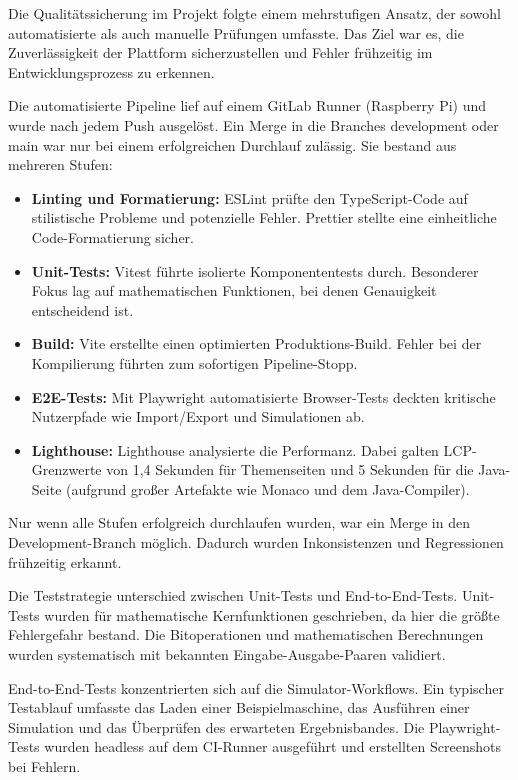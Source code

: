  \label{5_1_QS}

Die Qualitätssicherung im Projekt folgte einem mehrstufigen Ansatz, der sowohl automatisierte als auch manuelle Prüfungen umfasste. Das Ziel war es, die Zuverlässigkeit der Plattform sicherzustellen und Fehler frühzeitig im Entwicklungsprozess zu erkennen.


Die automatisierte Pipeline lief auf einem GitLab Runner (Raspberry Pi) und wurde nach jedem Push ausgelöst. Ein Merge in die Branches development oder main war nur bei einem erfolgreichen Durchlauf zulässig. Sie bestand aus mehreren Stufen:
\begin{itemize}
  \item \textbf{Linting und Formatierung:} ESLint prüfte den TypeScript-Code auf stilistische Probleme und potenzielle Fehler. Prettier stellte eine einheitliche Code-Formatierung sicher.
  \item \textbf{Unit-Tests:} Vitest führte isolierte Komponententests durch. Besonderer Fokus lag auf mathematischen Funktionen, bei denen Genauigkeit entscheidend ist.
  \item \textbf{Build:} Vite erstellte einen optimierten Produktions-Build. Fehler bei der Kompilierung führten zum sofortigen Pipeline-Stopp.
  \item \textbf{E2E-Tests:} Mit Playwright automatisierte Browser-Tests deckten kritische Nutzerpfade wie Import/Export und Simulationen ab.
  \item \textbf{Lighthouse:} Lighthouse analysierte die Performanz. Dabei galten LCP-Grenzwerte von 1,4 Sekunden für Themenseiten und 5 Sekunden für die Java-Seite (aufgrund großer Artefakte wie Monaco und dem Java-Compiler).
\end{itemize}

Nur wenn alle Stufen erfolgreich durchlaufen wurden, war ein Merge in den Development-Branch möglich. Dadurch wurden Inkonsistenzen und Regressionen frühzeitig erkannt.


Die Teststrategie unterschied zwischen Unit-Tests und End-to-End-Tests. Unit-Tests wurden für mathematische Kernfunktionen geschrieben, da hier die größte Fehlergefahr bestand. Die Bitoperationen und mathematischen Berechnungen wurden systematisch mit bekannten Eingabe-Ausgabe-Paaren validiert.

End-to-End-Tests konzentrierten sich auf die Simulator-Workflows. Ein typischer Testablauf umfasste das Laden einer Beispielmaschine, das Ausführen einer Simulation und das Überprüfen des erwarteten Ergebnisbandes. Die Playwright-Tests wurden headless auf dem CI-Runner ausgeführt und erstellten Screenshots bei Fehlern.

